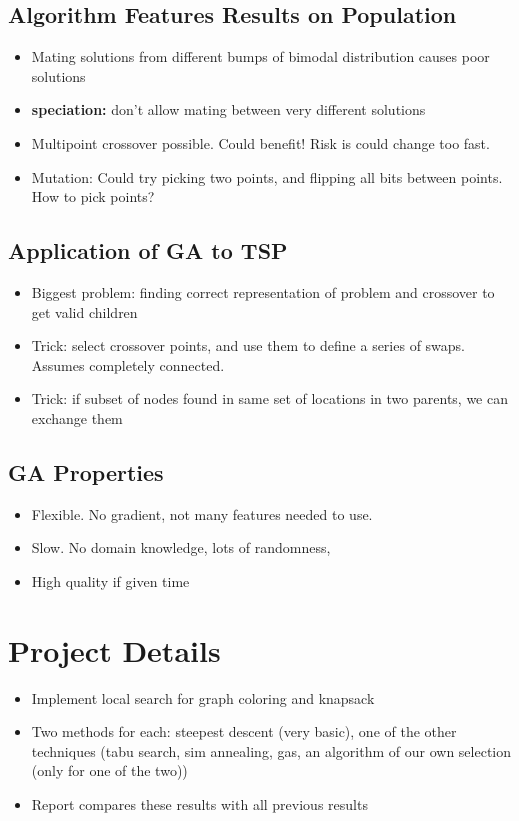 \documentclass[12pt, letter]{article}
\begin{document}
\subsection*{Algorithm Features Results on Population}
\begin{itemize}
	\item Mating solutions from different bumps of bimodal distribution causes poor solutions
	\item \textbf{speciation:} don't allow mating between very different solutions
	\item Multipoint crossover possible. Could benefit! Risk is could change too fast.
	\item Mutation: Could try picking two points, and flipping all bits between points. How to pick points?
\end{itemize}

\subsection*{Application of GA to TSP}
\begin{itemize}
	\item Biggest problem: finding correct representation of problem and crossover to get valid children
	\item Trick: select crossover points, and use them to define a series of swaps. Assumes completely connected.
	\item Trick: if subset of nodes found in same set of locations in two parents, we can exchange them
\end{itemize}

\subsection*{GA Properties}
\begin{itemize}
	\item Flexible. No gradient, not many features needed to use.
	\item Slow. No domain knowledge, lots of randomness, 
	\item High quality if given time
\end{itemize}

\section{Project Details}%
\label{sec:project_details}
\begin{itemize}
	\item Implement local search for graph coloring and knapsack
	\item Two methods for each: steepest descent (very basic), one of the other techniques (tabu search, sim annealing, gas, an algorithm of our own selection (only for one of the two))
	\item Report compares these results with all previous results
\end{itemize}
\end{document}
